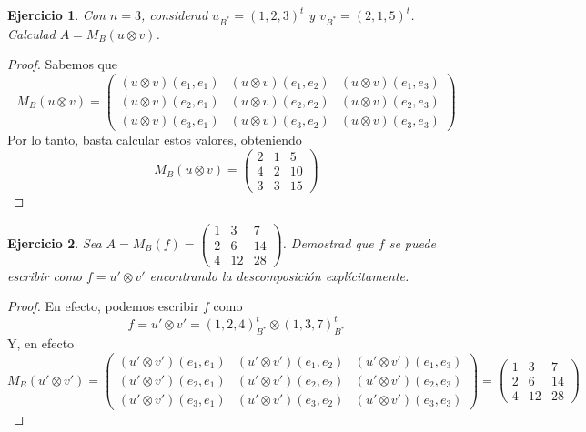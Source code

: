 \documentclass[12pt]{article}
\theoremstyle{break}
\newtheorem{ej}{Ejercicio}
\newtheorem*{proof}{Demostración}
\begin{document}
\begin{ej}
Con $n = 3$, considerad $u_{B^*} = (1, 2, 3)^t$ y $v_{B^*} = (2, 1, 5)^t$. Calculad
$A = M_B(u \otimes v)$.
\end{ej}
\begin{proof}
	Sabemos que
	\[
		M_B(u \otimes v) = \begin{pmatrix}
			(u \otimes v)(e_1,e_1) & (u \otimes v)(e_1,e_2) & (u \otimes v)(e_1,e_3) \\
			(u \otimes v)(e_2,e_1) & (u \otimes v)(e_2,e_2) & (u \otimes v)(e_2,e_3) \\
			(u \otimes v)(e_3,e_1) & (u \otimes v)(e_3,e_2) & (u \otimes v)(e_3,e_3)
		\end{pmatrix}
	\]
	Por lo tanto, basta calcular estos valores, obteniendo
	\[
		M_B(u \otimes v) = \begin{pmatrix}
			2 & 1 & 5 \\
			4 & 2 & 10 \\
			3 & 3 & 15
		\end{pmatrix}
	\]
\end{proof}

\begin{ej}
	Sea $A = M_B(f) = \begin{pmatrix}
		1 & 3 & 7 \\ 2 & 6 & 14 \\ 4 & 12 & 28
	\end{pmatrix}$. Demostrad que $f$ se puede escribir como $f = u' \otimes v'$ encontrando
	la descomposición explícitamente.
\end{ej}
\begin{proof}
	En efecto, podemos escribir $f$ como
	\[
		f = u' \otimes v' = (1,2,4)^t_{B^*} \otimes (1,3,7)^t_{B^*}
	\]
	Y, en efecto
	\[
		M_B(u' \otimes v') = \begin{pmatrix}
		(u' \otimes v')(e_1,e_1) & (u' \otimes v')(e_1,e_2) & (u' \otimes v')(e_1,e_3) \\
		(u' \otimes v')(e_2,e_1) & (u' \otimes v')(e_2,e_2) & (u' \otimes v')(e_2,e_3) \\
		(u' \otimes v')(e_3,e_1) & (u' \otimes v')(e_3,e_2) & (u' \otimes v')(e_3,e_3)
		\end{pmatrix} = \begin{pmatrix}
			1 & 3 & 7 \\ 2 & 6 & 14 \\ 4 & 12 & 28
		\end{pmatrix}
	\]
\end{proof}
\end{document}
